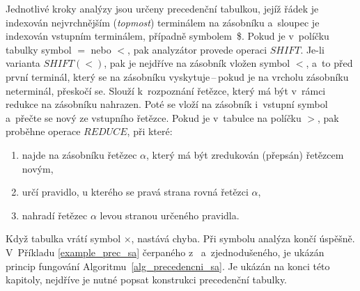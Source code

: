 Jednotlivé kroky analýzy jsou určeny precedenční tabulkou, jejíž řádek je indexován nejvrchnějším (\emph{topmost}) terminálem na zásobníku a~sloupec je indexován vstupním terminálem, případně symbolem~\$.
Pokud je v~políčku tabulky symbol $=$ nebo $<$, pak analyzátor provede operaci $SHIFT$.
Je-li varianta $SHIFT(<)$, pak je nejdříve na zásobník vložen symbol $<$, a~to před první terminál, který se na zásobníku vyskytuje\,--\,pokud je na vrcholu zásobníku neterminál, přeskočí se.
Slouží k~rozpoznání řetězce, který má být v~rámci redukce na zásobníku nahrazen.
Poté se vloží na zásobník i~vstupní symbol a~přečte se nový ze vstupního řetězce.
Pokud je v~tabulce na políčku $>$, pak proběhne operace $REDUCE$, při které:
\begin{enumerate}
    \item najde na zásobníku řetězec $\alpha$, který má být zredukován (přepsán) řetězcem novým,
    \item určí pravidlo, u kterého se pravá strana rovná řetězci $\alpha$,
    \item nahradí řetězec $\alpha$ levou stranou určeného pravidla.
\end{enumerate}
Když tabulka vrátí symbol $\times$, nastává chyba. 
Při symbolu \checkmark analýza končí úspěšně.
V~Příkladu \ref{example_prec_sa} čerpaného z~\cite{medunaElementsOfCompDesign} a~zjednodušeného, je ukázán princip fungování Algoritmu~\ref{alg_precedencni_sa}.
Je ukázán na konci této kapitoly, nejdříve je nutné popsat konstrukci precedenční tabulky.

